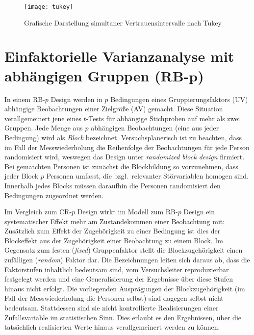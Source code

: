 \begin{figure}[ht]
\centering
\texttt{[image: tukey]}
\vspace*{-0.5em}
\caption{Grafische Darstellung simultaner Vertrauensintervalle nach Tukey}
\label{fig:tukey}
\end{figure}

\section[Einfaktorielle Varianzanalyse mit abhängigen Gruppen (RB-\texorpdfstring{$p$}{p})]{Einfaktorielle Varianzanalyse mit abhängigen Gruppen (RB-$\bm{p}$)}
\label{sec:RBp}

In einem RB-$p$ Design werden in $p$ Bedingungen eines Gruppierungsfaktors (UV) abhängige Beobachtungen einer Zielgröße (AV) gemacht. Diese Situation verallgemeinert jene eines $t$-Tests für abhängige Stichproben auf mehr als zwei Gruppen. Jede Menge aus $p$ abhängigen Beobachtungen (eine aus jeder Bedingung) wird als \emph{Block} bezeichnet. Versuchsplanerisch ist zu beachten, dass im Fall der Messwiederholung die Reihenfolge der Beobachtungen für jede Person randomisiert wird, weswegen das Design unter \emph{randomized block design} firmiert. Bei gematchten Personen ist zunächst die Blockbildung so vorzunehmen, dass jeder Block $p$ Personen umfasst, die bzgl.\ relevanter Störvariablen homogen sind. Innerhalb jedes Blocks müssen daraufhin die Personen randomisiert den Bedingungen zugeordnet werden.

Im Vergleich zum CR-$p$ Design wirkt im Modell zum RB-$p$ Design ein systematischer Effekt mehr am Zustandekommen einer Beobachtung mit: Zusätzlich zum Effekt der Zugehörigkeit zu einer Bedingung ist dies der Blockeffekt aus der Zugehörigkeit einer Beobachtung zu einem Block. Im Gegensatz zum festen (\emph{fixed}) Gruppenfaktor stellt die Blockzugehörigkeit einen zufälligen (\emph{random}) Faktor dar. Die Bezeichnungen leiten sich daraus ab, dass die Faktorstufen inhaltlich bedeutsam sind, vom Versuchsleiter reproduzierbar festgelegt werden und eine Generalisierung der Ergebnisse über diese Stufen hinaus nicht erfolgt. Die vorliegenden Ausprägungen der Blockzugehörigkeit (im Fall der Messwiederholung die Personen selbst) sind dagegen selbst nicht bedeutsam. Stattdessen sind sie nicht kontrollierte Realisierungen einer Zufallsvariable im statistischen Sinn. Dies erlaubt es den Ergebnissen, über die tatsächlich realisierten Werte hinaus verallgemeinert werden zu können.

